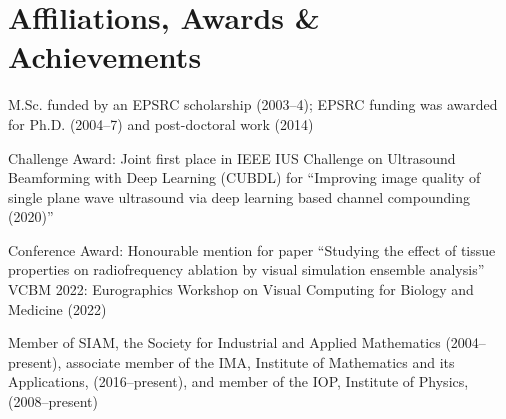 \documentclass[11pt, a4paper]{awesome-cv}
\begin{document}
\newpage
\hypertarget{Awards, affiliations, achievements}{\section{Affiliations, Awards \& Achievements}\label{awards}}
%
\begin{cventries}
%

{}
{}
{\vspace*{-0.5cm}
\begin{cvitems}%
\item M.Sc. funded by an EPSRC scholarship (2003--4); EPSRC funding was awarded for Ph.D. (2004--7) and post-doctoral work (2014)
\end{cvitems}}

{}
{}
{\vspace*{-0.5cm}
\begin{cvitems}
\item Challenge Award: Joint first place in IEEE IUS Challenge on Ultrasound Beamforming with Deep Learning (CUBDL) for \enquote{Improving image quality of single plane wave ultrasound via deep learning based channel compounding (2020)}
\item Conference Award: Honourable mention for paper \enquote{Studying the effect of tissue properties on radiofrequency ablation by visual simulation ensemble analysis} VCBM 2022: Eurographics Workshop on Visual Computing for Biology and Medicine (2022)
\end{cvitems}}

{}
{}
{\vspace*{-0.5cm}
\begin{cvitems}%
\item Member of SIAM, the Society for Industrial and Applied Mathematics (2004--present), associate member of the IMA, Institute of Mathematics and its Applications, \mbox{(2016--present)}, and member of the IOP, Institute of Physics, (2008--present)
\end{cvitems}}


\end{cventries}
\end{document}
